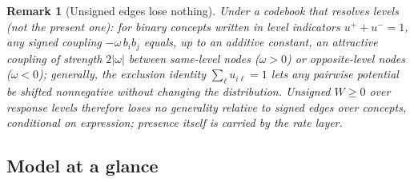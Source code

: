 \documentclass[11pt]{article}
\newtheorem*{remark}{Remark}
\newcommand{\1}{\mathbb{1}}
\begin{document}
\begin{remark}[Unsigned edges lose nothing]
Under a codebook that resolves levels (not the present one): for binary concepts written in level indicators $u^+ + u^- = 1$, any signed coupling $-\omega\,b_ib_j$ equals, up to an additive constant, an attractive coupling of strength $2|\omega|$ between same-level nodes ($\omega>0$) or opposite-level nodes ($\omega<0$); generally, the exclusion identity $\sum_\ell u_{i\ell}=1$ lets any pairwise potential be shifted nonnegative without changing the distribution. Unsigned $W\ge0$ over response levels therefore loses no generality relative to signed edges over concepts, conditional on expression; presence itself is carried by the rate layer.
\end{remark}


\subsection*{Model at a glance}
\end{document}
